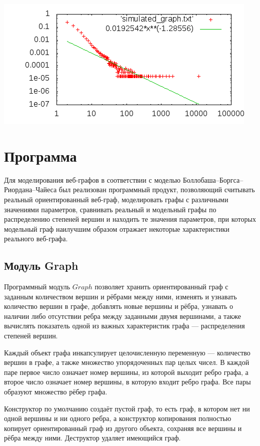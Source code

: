 \documentclass[14pt]{extreport}
\begin{document}
\begin{center}
\includegraphics{code/simulated_graph.png}
\end{center}

\chapter{Программа}

Для моделирования веб-графов в соответствии с моделью Боллобаша--Боргса--Риордана--Чайеса был реализован программный продукт, позволяющий считывать реальный ориентированный веб-граф, моделировать графы с различными значениями параметров, сравнивать реальный и модельный графы по распределению степеней вершин и находить те значения параметров, при которых модельный граф наилучшим образом отражает некоторые характеристики реального веб-графа.

\section{Модуль Graph}

Программный модуль $Graph$ позволяет хранить ориентированный граф с заданным количеством вершин и рёбрами между ними, изменять и узнавать количество вершин в графе, добавлять новые вершины и рёбра, узнавать о наличии либо отсутствии ребра между заданными двумя вершинами, а также вычислять показатель одной из важных характеристик графа --- распределения степеней вершин.

Каждый объект графа инкапсулирует целочисленную переменную --- количество вершин в графе, а также множество упорядоченных пар целых чисел. В каждой паре первое число означает номер вершины, из которой выходит ребро графа, а второе число означает номер вершины, в которую входит ребро графа. Все пары образуют множество рёбер графа.

Конструктор по умолчанию создаёт пустой граф, то есть граф, в котором нет ни одной вершины и ни одного ребра, а конструктор копирования полностью копирует ориентированный граф из другого объекта, сохраняя все вершины и рёбра между ними. Деструктор удаляет имеющийся граф.
\end{document}
